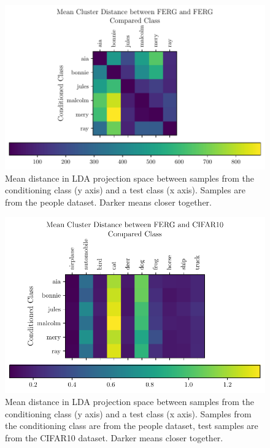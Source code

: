 \begin{figure}[htpb]
	\centering
	\includegraphics{figures/samples/ferg_distance_matrix_ferg_lda.pdf}
	\caption{Mean distance in LDA projection space between samples from the
		conditioning class (y axis) and a test class (x axis). Samples
		are from the people dataset. Darker means closer together.}%
	\label{fig:ferg_distance_matrix}
\end{figure}

\begin{figure}[htpb]
	\centering
	\includegraphics{figures/samples/ferg_distance_matrix_cifar_lda.pdf}
	\caption{Mean distance in LDA projection space between samples from the
		conditioning class (y axis) and a test class (x axis). Samples
		from the conditioning class are from the people dataset, test
		samples are from the CIFAR10 dataset. Darker means closer
		together.}%
	\label{fig:ferg_distance_matrix_cifar}
\end{figure}

